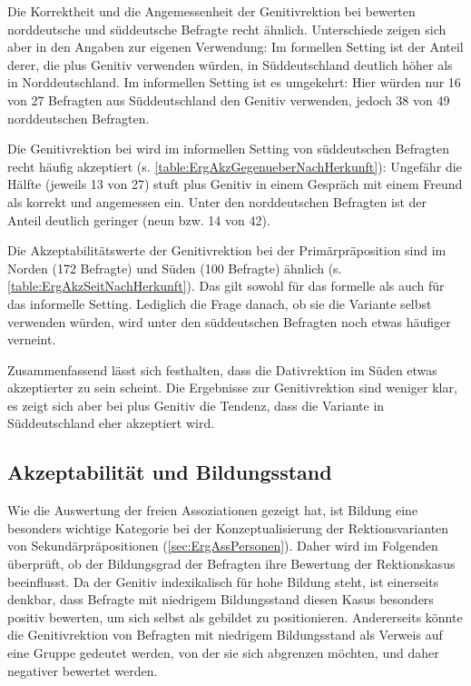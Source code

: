 Die Korrektheit und die Angemessenheit der Genitivrektion bei \dank{} bewerten norddeutsche und süddeutsche Befragte recht ähnlich.
Unterschiede zeigen sich aber in den Angaben zur eigenen Verwendung: 
Im formellen Setting ist der Anteil derer, die \dank{} plus Genitiv verwenden würden, in Süddeutschland deutlich höher als in Norddeutschland. 
Im informellen Setting ist es umgekehrt: Hier würden nur 16 von 27 Befragten aus Süddeutschland den Genitiv verwenden, jedoch 38 von 49 norddeutschen Befragten. 

Die Genitivrektion bei \gegenueber{} wird im informellen Setting von süddeutschen Befragten recht häufig akzeptiert (s. \autoref{table:ErgAkzGegenueberNachHerkunft}): 
Ungefähr die Hälfte (jeweils 13 von 27) stuft \gegenueber{} plus Genitiv in einem Gespräch mit einem Freund als korrekt und angemessen ein. 
Unter den norddeutschen Befragten ist der Anteil deutlich geringer (neun bzw. 14 von 42). 


\begin{sloppypar}
Die Akzeptabilitätswerte der Genitivrektion bei der Primärpräposition  sind im Norden (172 Befragte) und Süden (100 Befragte) ähnlich (s. \autoref{table:ErgAkzSeitNachHerkunft}).
Das gilt sowohl für das formelle als auch für das informelle Setting. 
Lediglich die Frage danach, ob sie die Variante selbst verwenden würden, wird unter den süddeutschen Befragten noch etwas häufiger verneint. 
\end{sloppypar}

Zusammenfassend lässt sich festhalten, dass die Dativrektion im Süden etwas akzeptierter zu sein scheint. 
Die Ergebnisse zur Genitivrektion sind weniger klar, es zeigt sich aber bei \gegenueber{} plus Genitiv die Tendenz, dass die Variante in Süddeutschland eher akzeptiert wird. 

\subsection{Akzeptabilität und Bildungsstand}
\label{sec:ErgAkzNachBildung}
Wie die Auswertung der freien Assoziationen gezeigt hat, ist Bildung eine besonders wichtige Kategorie bei der Konzeptualisierung der Rektionsvarianten von Sekundärpräpositionen (\autoref{sec:ErgAssPersonen}). 
Daher wird im Folgenden überprüft, ob der Bildungsgrad der Befragten ihre Bewertung der Rektionskasus beeinflusst. 
Da der Genitiv indexikalisch für hohe Bildung steht, ist einerseits denkbar, dass Befragte mit niedrigem Bildungsstand diesen Kasus besonders positiv bewerten, um sich selbst als gebildet zu positionieren. 
Andererseits könnte die Genitivrektion von Befragten mit niedrigem Bildungsstand als Verweis auf eine Gruppe gedeutet werden, von der sie sich abgrenzen möchten, und daher negativer bewertet werden. 

